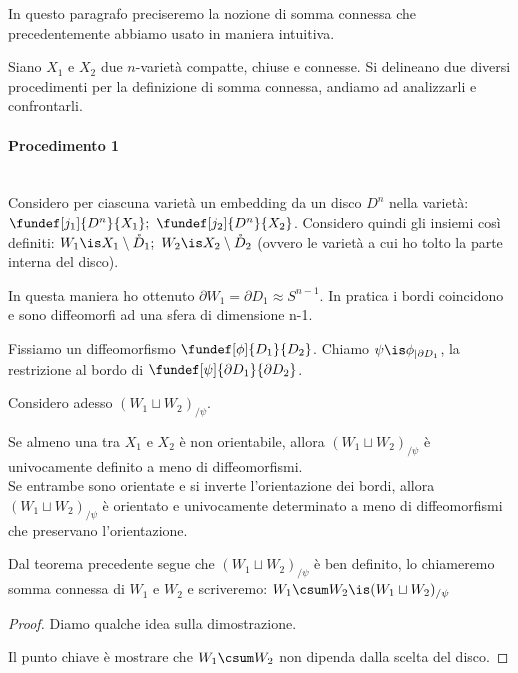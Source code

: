 

In questo paragrafo preciseremo la nozione di somma connessa che precedentemente abbiamo usato in maniera intuitiva.

Siano $X_1$ e $X_2$ due $n$-varietà compatte, chiuse e connesse. Si delineano due diversi procedimenti per la definizione di somma connessa, andiamo ad analizzarli e confrontarli.

\paragraph{Procedimento 1}~\\
Considero per ciascuna varietà un embedding da un disco $D^n$ nella varietà:
$	\fundef[j_1]{D^n}{X_1}; ~\fundef[j_2]{D^n}{X_2}$. Considero quindi gli insiemi così definiti: $W_1 \is X_1 \setminus \mathring{D}_1; ~ W_2 \is X_2 \setminus \mathring{D}_2$ (ovvero le varietà a cui ho tolto la parte interna del disco).

In questa maniera ho ottenuto $\partial W_1 = \partial D_1 \approx S^{n-1}$. In pratica i bordi coincidono e sono diffeomorfi ad una sfera di dimensione n-1.

Fissiamo un diffeomorfismo $\fundef[\phi]{D_1}{D_2}$. Chiamo $\psi \is \phi_{|\partial D_1}$, la restrizione al bordo di $\fundef[\psi]{\partial D_1}{\partial D_2}$.

Considero adesso $(W_1 \sqcup W_2)_{/\psi}$.

\begin{teo}
Se almeno una tra $X_1$ e $X_2$ è non orientabile, allora $(W_1 \sqcup W_2)_{/\psi}$ è univocamente definito a meno di diffeomorfismi.\\
Se entrambe sono orientate e si inverte l'orientazione dei bordi, allora $(W_1 \sqcup W_2)_{/\psi}$ è orientato e univocamente determinato a meno di diffeomorfismi che preservano l'orientazione.
\end{teo}

\begin{defn}
Dal teorema precedente segue che $(W_1 \sqcup W_2)_{/\psi}$ è ben definito, lo chiameremo somma connessa di $W_1$ e $W_2$ e scriveremo: $W_1\csum W_2 \is (W_1 \sqcup W_2)_{/\psi}$
\end{defn}

\begin{proof}
Diamo qualche idea sulla dimostrazione.

Il punto chiave è mostrare che $W_1 \csum W_2$ non dipenda dalla scelta del disco.

\end{proof}

